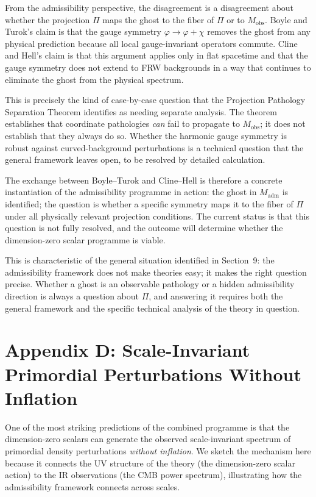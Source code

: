 \documentclass[12pt,a4paper]{article}
\theoremstyle{remark}
\begin{document}
From the admissibility perspective, the disagreement is a disagreement about whether the projection
$\Pi$ maps the ghost to the fiber of $\Pi$ or to $M_{\mathrm{obs}}$. Boyle and Turok's claim is
that the gauge symmetry $\varphi \to \varphi + \chi$ removes the ghost from any physical prediction
because all local gauge-invariant operators commute. Cline and Hell's claim is that this argument
applies only in flat spacetime and that the gauge symmetry does not extend to FRW backgrounds in
a way that continues to eliminate the ghost from the physical spectrum.

This is precisely the kind of case-by-case question that the Projection Pathology Separation
Theorem identifies as needing separate analysis. The theorem establishes that coordinate
pathologies \emph{can} fail to propagate to $M_{\mathrm{obs}}$; it does not establish that they
always do so. Whether the harmonic gauge symmetry is robust against curved-background perturbations
is a technical question that the general framework leaves open, to be resolved by detailed
calculation.

The exchange between Boyle--Turok and Cline--Hell is therefore a concrete instantiation of the
admissibility programme in action: the ghost in $M_{\mathrm{adm}}$ is identified; the question
is whether a specific symmetry maps it to the fiber of $\Pi$ under all physically relevant
projection conditions. The current status is that this question is not fully resolved, and the
outcome will determine whether the dimension-zero scalar programme is viable.

This is characteristic of the general situation identified in Section~9: the admissibility
framework does not make theories easy; it makes the right question precise. Whether a ghost is
an observable pathology or a hidden admissibility direction is always a question about $\Pi$,
and answering it requires both the general framework and the specific technical analysis of the
theory in question.


\section*{Appendix D: Scale-Invariant Primordial Perturbations Without Inflation}

One of the most striking predictions of the combined programme is that the dimension-zero
scalars can generate the observed scale-invariant spectrum of primordial density perturbations
\emph{without inflation}. We sketch the mechanism here because it connects the UV structure
of the theory (the dimension-zero scalar action) to the IR observations (the CMB power spectrum),
illustrating how the admissibility framework connects across scales.
\end{document}
